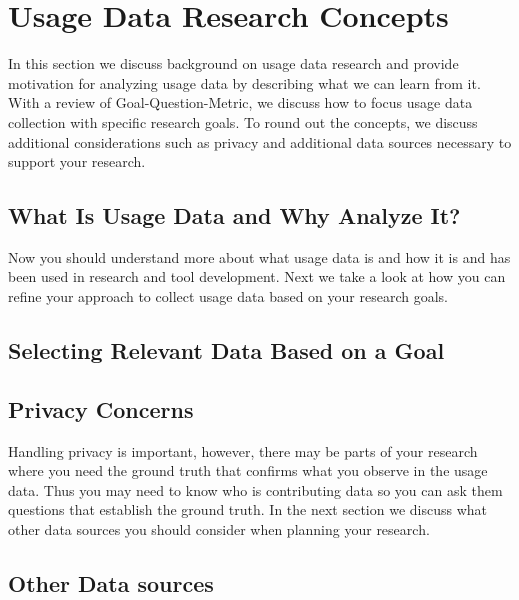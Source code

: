 
\section{Usage Data Research Concepts}

In this section we discuss background on usage data research and provide motivation for analyzing usage data by describing what we can learn from it.  With a review of Goal-Question-Metric, we discuss how to focus usage data collection with specific research goals.  To round out the concepts, we discuss additional considerations such as privacy and additional data sources necessary to support your research.

\subsection{What Is Usage Data and Why Analyze It?}

\vspace{0.1in}
Now you should understand more about what usage data is and how it is and has been used in research and tool development.  Next we take a look at how you can refine your approach to collect usage data based on your research goals.

\subsection{Selecting Relevant Data Based on a Goal}


\vspace{0.1in}

\subsection{Privacy Concerns}


\vspace{0.1in}
Handling privacy is important, however, there may be parts of your research where you need the ground truth that confirms what you observe in the usage data.  Thus you may need to know who is contributing data so you can ask them questions that establish the ground truth.  In the next section we discuss what other data sources you should consider when planning your research.

\subsection{Other Data sources}


